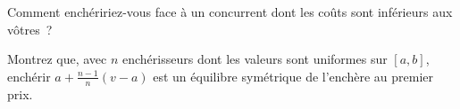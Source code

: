 \begin{interviewq}\label{iq:hf:on-chain-trading:5}
Comment enchéririez-vous face à un concurrent dont les coûts sont inférieurs aux vôtres~?
\end{interviewq}

\begin{interviewq}\label{iq:hf:on-chain-trading:6}
Montrez que, avec $n$ enchérisseurs dont les valeurs sont uniformes sur $[a,b]$, enchérir $a+\frac{n-1}{n}(v-a)$ est un équilibre symétrique de l'enchère au
premier prix.
\end{interviewq}
